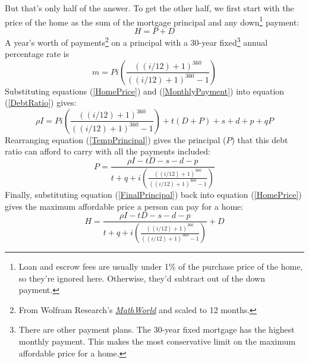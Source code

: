\documentclass{article}
\begin{document}
But that's only half of the answer. To get the other half, we first start with the 
price of the home as the sum of the mortgage principal and any down\footnote{
Loan and escrow fees are usually under 1\% of the purchase price of the home, so 
they're ignored here. Otherwise, they'd subtract out of the down payment.} payment:
\begin{equation}
\label{HomePrice}
H = P + D
\end{equation}
A year's worth of payments\footnote{From Wolfram Research's \href{http://mathworld.wolfram.com/Mortgage.html}{\emph{MathWorld}} 
and scaled to 12 months.} on
a principal with a 30-year fixed\footnote{
There are other payment plans. The 30-year fixed mortgage has the highest monthly payment. This makes the most conservative limit on the maximum affordable price for a home.} annual percentage rate is
\begin{equation}
\label{MonthlyPayment}
m = Pi \left( \frac{((i/12) + 1)^{360}}{((i/12) + 1)^{360} - 1} \right)
\end{equation}
Substituting equations (\ref{HomePrice}) and (\ref{MonthlyPayment}) into 
equation (\ref{DebtRatio}) gives:
\begin{equation}
\label{TempPrincipal}
\rho I = P i \left( \frac{((i/12) + 1)^{360}}{((i/12) + 1)^{360} - 1} \right)
+ t(D + P) + s + d + p + qP
\end{equation}
Rearranging equation (\ref{TempPrincipal}) gives the principal ($P$) that 
this debt ratio can afford to carry with all the payments included:
\begin{equation}
\label{FinalPrincipal}
P = \frac{\rho I - tD - s - d - p}{t + q +
i \left( \frac{((i/12) + 1)^{360}}{((i/12) + 1)^{360} - 1} \right)}
\end{equation}
Finally, substituting equation (\ref{FinalPrincipal}) back into equation (\ref{HomePrice}) gives the maximum affordable price a person can pay for a home:
\begin{equation}
\label{FinalHomePrice}
H = \frac{\rho I - tD - s - d - p}{t + q +
i \left( \frac{((i/12) + 1)^{360}}{((i/12) + 1)^{360} - 1} \right)} + D
\end{equation}
\end{document}
